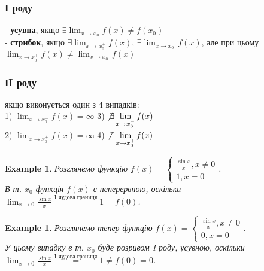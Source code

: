 \documentclass[a4paper, 14pt]{article}
\def\huge{\displaystyle}
\theoremstyle{theoremdd}
\theoremstyle{theoremdd}
\theoremstyle{theoremdd}
\theoremstyle{theoremdd}
\newtheorem{example}[theorem]{Example}
\theoremstyle{theoremdd}
\theoremstyle{theoremdd}
\theoremstyle{theoremdd}
\theoremstyle{theoremdd}
\begin{document}
\subsubsection*{І роду}
- \textbf{усувна}, якщо $\exists \huge \lim_{x \to x_0} f(x) \neq f(x_0)$\\
- \textbf{стрибок}, якщо $\exists \huge \lim_{x \to x_0^+} f(x)$, $\exists \huge \lim_{x \to x_0^-} f(x)$, але при цьому $\huge \lim_{x \to x_0^+} f(x) \neq \lim_{x \to x_0^-} f(x)$

\subsubsection*{ІI роду}
якщо виконується один з 4 випадків:\\
1) $\huge \lim_{x \to x_0^-} f(x) = \infty$ \hspace{3cm} 3) $\huge \not\exists \lim_{x \to x_0^-} f(x)$\\
2) $\huge \lim_{x \to x_0^+} f(x) = \infty$ \hspace{3cm} 4) $\huge \not\exists \lim_{x \to x_0^+} f(x)$

\begin{example}
Розглянемо функцію $f(x) = \begin{cases} \huge \frac{\sin x}{x}, x \neq 0 \\ 1, x = 0 \end{cases}$.\\
В т. $x_0$ функція $f(x)$ є неперервною, оскільки
$\huge \lim_{x \to 0} \frac{\sin x}{x} \overset{\textrm{I чудова границя}}{=} 1 = f(0)$.
\end{example}

\begin{example}
Розглянемо тепер функцію $f(x) = \begin{cases} \huge \frac{\sin x}{x}, x \neq 0 \\ 0, x = 0 \end{cases}$.\\
У цьому випадку в т. $x_0$ буде розривом I роду, усувною, оскільки\\
$\huge \lim_{x \to 0} \frac{\sin x}{x} \overset{\textrm{I чудова границя}}{=} 1 \neq f(0) = 0$.\\
\begin{figure} [H]
\centering
\resizebox{1\textwidth}{!}
{
}
\end{figure}
\end{example}
\end{document}
